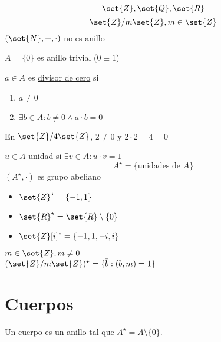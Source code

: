 \documentclass[11pt]{book}
\begin{document}
    \begin{ejm}
        \[\set{Z},\set{Q},\set{R}\]
        \[\set{Z}/m\set{Z},m\in\set{Z}\]
        $(\set{N},+,\cdot)$ no es anillo
    \end{ejm}

    \begin{obs}
        $A=\{0\}$ es anillo trivial ($0\equiv 1$)
    \end{obs}

    \begin{defn}
        $a\in A$ es \underline{divisor de cero} si
        \begin{enumerate}
            \item $a\neq 0$

            \item $\exists b\in A: b\neq0 \wedge a\cdot b=0$
        \end{enumerate}
    \end{defn}

    \begin{ejm}
        En $\set{Z}/4\set{Z}$, $\bar{2}\neq\bar{0}$ y $\bar{2}\cdot\bar{2}=\bar{4}=\bar{0}$
    \end{ejm}

    \begin{defn}[Unidad]
        $u\in A$ \underline{unidad} si $\exists v\in A: u\cdot v=1$
        \[A^\star=\{\text{unidades de }A\}\]
        $(A^\star,\cdot)$ es grupo abeliano
    \end{defn}

    \begin{ejm}
        \hfill
        \begin{itemize}
            \item $\set{Z}^\star=\{-1,1\}$

            \item $\set{R}^\star=\set{R}\setminus\{0\}$

            \item $\set{Z}[i]^\star=\{-1,1,-i,i\}$
        \end{itemize}
    \end{ejm}

    \begin{eje}
        $m\in\set{Z},m\neq 0$\\
        $(\set{Z}/m\set{Z})^\star=\{\bar{b}:(b,m)=1\}$
    \end{eje}

    \chapter{Cuerpos}
    \begin{defn}[Cuerpo]
        Un \underline{cuerpo} es un anillo tal que $A^\star=A\setminus\{0\}$.
    \end{defn}
\end{document}
